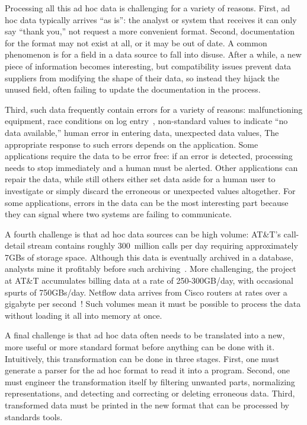 \documentclass{entcs}
\begin{document}
Processing all this ad hoc data is challenging for a variety of
reasons.  First, ad hoc data typically arrives ``as is'': the analyst
or system that receives it can only say ``thank you,'' not request a
more convenient format.  Second, documentation for the format may not
exist at all, or it may be out of date.  A common phenomenon is for a
field in a data source to fall into disuse.  After a while, a new
piece of information becomes interesting, but compatibility issues
prevent data suppliers from modifying the shape of their data, so
instead they hijack the unused field, often failing to update the
documentation in the process.

Third, such data frequently contain errors for a variety of reasons:
malfunctioning equipment, race conditions on log entry~\cite{wpp},
non-standard values to indicate ``no data available,'' human error in
entering data, unexpected data values, \etc{} The appropriate response
to such errors depends on the application.  Some applications require
the data to be error free: if an error is detected, processing needs
to stop immediately and a human must be alerted.  Other applications
can repair the data, while still others either set data aside for a
human user to investigate or simply discard the erroneous or
unexpected values altogether.  For some applications, errors in the
data can be the most interesting part because they can signal where
two systems are failing to communicate.

A fourth challenge is that ad hoc data sources can be high volume:
AT\&T's call-detail stream contains roughly 300~million calls per day
requiring approximately 7GBs of storage space. Although this data is
eventually archived in a database, analysts mine it profitably before
such archiving~\cite{kdd98,kdd99}. More challenging, the \ningaui{}
project at AT\&T accumulates billing data at a rate of 250-300GB/day,
with occasional spurts of 750GBs/day. Netflow data arrives from Cisco
routers at rates over a gigabyte per second~\cite{gigascope}! Such
volumes mean it must be possible to process the data without loading
it all into memory at once.

A final challenge is that ad hoc data often needs to be translated
into a new, more useful or more standard format before anything can be
done with it.  Intuitively, this transformation can be done in three
stages.  First, one must generate a parser for the ad hoc format to
read it into a program.  Second, one must engineer the transformation
itself by filtering unwanted parts, normalizing representations, and
detecting and correcting or deleting erroneous data.  Third,
transformed data must be printed in the new format that can be
processed by standards tools.
\end{document}
